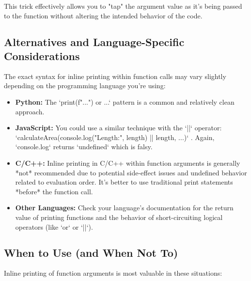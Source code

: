 \documentclass{article}
\begin{document}
{{{{This trick effectively allows you to "tap" the argument value as it's being passed to the function without altering the intended behavior of the code.

\subsection*{Alternatives and Language-Specific Considerations}

The exact syntax for inline printing within function calls may vary slightly depending on the programming language you're using:

\begin{itemize}
    \item \textbf{Python:} The `print(f"...") or ...` pattern is a common and relatively clean approach.
    \item \textbf{JavaScript:} You could use a similar technique with the `||` operator: `calculateArea(console.log("Length:", length) || length, ...)` .  Again, `console.log` returns `undefined` which is falsy.
    \item \textbf{C/C++:} Inline printing in C/C++ within function arguments is generally *not* recommended due to potential side-effect issues and undefined behavior related to evaluation order.  It's better to use traditional print statements *before* the function call.
    \item \textbf{Other Languages:}  Check your language's documentation for the return value of printing functions and the behavior of short-circuiting logical operators (like `or` or `||`).

\end{itemize}

\subsection*{When to Use (and When Not To)}

Inline printing of function arguments is most valuable in these situations:

}}}}
\end{document}

